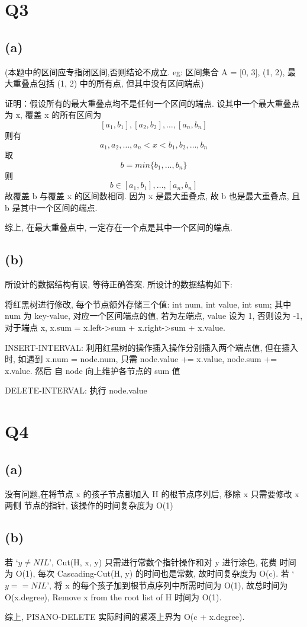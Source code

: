 \documentclass[UTF8]{ctexart}
\begin{document}
\begin{sloppypar}
\section*{Q3}
    \subsection*{(a)}
        (本题中的区间应专指闭区间,否则结论不成立. eg: 区间集合 A = {[0, 3], (1, 2)},
         最大重叠点包括 (1, 2) 中的所有点, 但其中没有区间端点)

        证明：假设所有的最大重叠点均不是任何一个区间的端点. 设其中一个最大重叠点为 x, 覆盖
        x 的所有区间为 \[[a_1, b_1], [a_2, b_2], \ldots, [a_n, b_n]\]
        则有 \[a_1, a_2, \ldots, a_n < x < b_1, b_2, \ldots, b_n\]
        取 \[b = min\{b_1, \ldots, b_n\}\]
        则 \[b \in [a_1, b_1], \ldots, [a_n, b_n]\]
        故覆盖 b 与覆盖 x 的区间数相同. 因为 x 是最大重叠点, 故 b 也是最大重叠点,
        且 b 是其中一个区间的端点.

        综上, 在最大重叠点中, 一定存在一个点是其中一个区间的端点.
    \subsection*{(b)}
        所设计的数据结构有误, 等待正确答案.
        所设计的数据结构如下:

        将红黑树进行修改, 每个节点额外存储三个值: int num, int value, int sum; 其中
        num 为 key-value, 对应一个区间端点的值, 若为左端点, value 设为 1, 否则设为 -1,
        对于端点 x, x.sum = x.left->sum + x.right->sum + x.value.

        INSERT-INTERVAL: 利用红黑树的操作插入操作分别插入两个端点值, 但在插入时, 如遇到
        x.num = node.num, 只需 node.value += x.value, node.sum += x.value. 然后
        自 node 向上维护各节点的 sum 值

        DELETE-INTERVAL: 执行 node.value

\section*{Q4}
    \subsection*{(a)}
        没有问题,在将节点 x 的孩子节点都加入 H 的根节点序列后, 移除 x 只需要修改 x 两侧
        节点的指针, 该操作的时间复杂度为 O(1)
    \subsection*{(b)}
        若 `$y \neq NIL$', Cut(H, x, y) 只需进行常数个指针操作和对 y 进行涂色, 花费
        时间为 O(1), 每次 Cascading-Cut(H, y) 的时间也是常数, 故时间复杂度为 O(c).
        若 `$y == NIL$', 将 x 的每个孩子加到根节点序列中所需时间为 O(1), 故总时间为
        O(x.degree), Remove x from the root list of H 时间为 O(1).

        综上, PISANO-DELETE 实际时间的紧凑上界为 O(c + x.degree).

\end{sloppypar}
\end{document}
